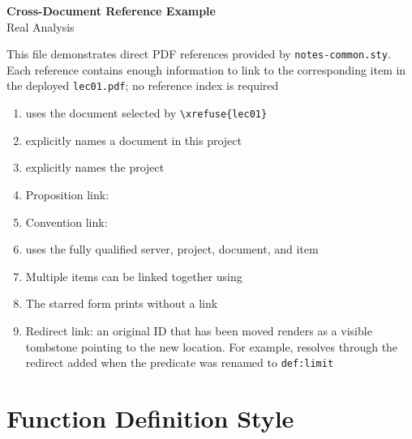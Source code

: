 \documentclass[12pt]{article}
\begin{document}
\begin{center}
  {\LARGE\bfseries Cross-Document Reference Example}\\[0.25em]
  {\large Real Analysis}\\[0.15em]
\end{center}

This file demonstrates direct PDF references provided by
\texttt{notes-common.sty}. Each reference contains enough information to link
to the corresponding item in the deployed \texttt{lec01.pdf}; no reference
index is required

\begin{enumerate}[label=\textbf{Example \arabic*.},leftmargin=*]
  \item {} uses the document selected by
  \verb|\xrefuse{lec01}|

  \item {} explicitly names a document in this project

  \item {} explicitly names the
  project

  \item Proposition link:

  \item Convention link:

  \item
  uses the fully qualified server, project, document, and item

  \item Multiple items can be linked together using

  \item The starred form  prints without a
  link

  \item Redirect link: an original ID that has been moved renders as a visible
  tombstone pointing to the new location. For example,
   resolves through the redirect added when
  the predicate was renamed to \texttt{def:limit}
\end{enumerate}

\section*{Function Definition Style}
\end{document}

